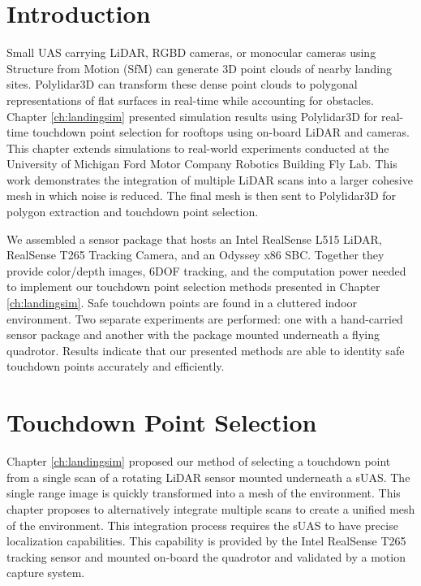 \section{Introduction}

Small UAS carrying LiDAR, RGBD cameras, or monocular cameras using Structure from Motion (SfM) can generate 3D point clouds of nearby landing sites. Polylidar3D can transform these dense point clouds to polygonal representations of flat surfaces in real-time while accounting for obstacles. Chapter \ref{ch:landingsim} presented simulation results using Polylidar3D for real-time touchdown point selection for rooftops using on-board LiDAR and cameras. This chapter extends simulations to real-world experiments conducted at the University of Michigan Ford Motor Company Robotics Building Fly Lab. This work demonstrates the integration of multiple LiDAR scans into a larger cohesive mesh in which noise is reduced. The final mesh is then sent to Polylidar3D for polygon extraction and touchdown point selection.

We assembled a sensor package that hosts an Intel RealSense L515 LiDAR, RealSense T265 Tracking Camera, and an Odyssey x86 \acf{SBC}. Together they provide color/depth images, 6DOF tracking, and the computation power needed to implement our touchdown point selection methods presented in Chapter \ref{ch:landingsim}. Safe touchdown points are found in a cluttered indoor environment. Two separate experiments are performed: one with a hand-carried sensor package and another with the package mounted underneath a flying quadrotor.  Results indicate that our presented methods are able to identity safe touchdown points accurately and efficiently.

\section{Touchdown Point Selection}\label{sec:ch7_volume_integration}

Chapter \ref{ch:landingsim} proposed our method of selecting a touchdown point from a single scan of a rotating LiDAR sensor mounted underneath a \ac{sUAS}. The single range image is quickly transformed into a mesh of the environment.  This chapter proposes to alternatively integrate multiple scans to create a unified mesh of the environment. This integration process requires the \ac{sUAS} to have precise localization capabilities. This capability is provided by the Intel RealSense T265 tracking sensor and mounted on-board the quadrotor and validated by a motion capture system.

